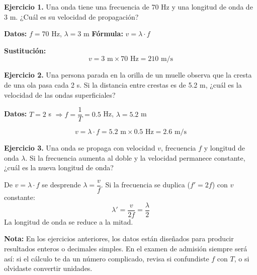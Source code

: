 \begin{seccion}

\textbf{Ejercicio 1.} Una onda tiene una frecuencia de 70 Hz y una longitud de onda de 3 m. ¿Cuál es su velocidad de propagación?

\begin{ecuacion}
\textbf{Datos:} $f = 70$ Hz, $\lambda = 3$ m \quad \textbf{Fórmula:} $v = \lambda \cdot f$

\textbf{Sustitución:}
$$v = 3 \text{ m} \times 70 \text{ Hz} = 210 \text{ m/s}$$
\end{ecuacion}

\vspace{0.4cm}

\textbf{Ejercicio 2.} Una persona parada en la orilla de un muelle observa que la cresta de una ola pasa cada 2 s. Si la distancia entre crestas es de 5.2 m, ¿cuál es la velocidad de las ondas superficiales?

\begin{ecuacion}
\textbf{Datos:} $T = 2$ s $\Rightarrow f = \dfrac{1}{T} = 0.5$ Hz, $\lambda = 5.2$ m

$$v = \lambda \cdot f = 5.2 \text{ m} \times 0.5 \text{ Hz} = 2.6 \text{ m/s}$$
\end{ecuacion}

\vspace{0.4cm}

\textbf{Ejercicio 3.} Una onda se propaga con velocidad $v$, frecuencia $f$ y longitud de onda $\lambda$. Si la frecuencia aumenta al doble y la velocidad permanece constante, ¿cuál es la nueva longitud de onda?

\begin{ecuacion}
De $v = \lambda \cdot f$ se desprende $\lambda = \dfrac{v}{f}$. Si la frecuencia se duplica ($f' = 2f$) con $v$ constante:
$$\lambda' = \frac{v}{2f} = \frac{\lambda}{2}$$
La longitud de onda se reduce a la mitad.
\end{ecuacion}

\begin{nota}
\textbf{Nota:} En los ejercicios anteriores, los datos están diseñados para producir resultados enteros o decimales simples. En el examen de admisión siempre será así: si el cálculo te da un número complicado, revisa si confundiste $f$ con $T$, o si olvidaste convertir unidades.
\end{nota}

\end{seccion}


